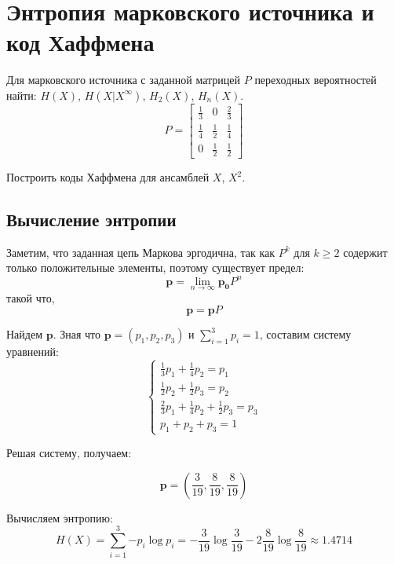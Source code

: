 \section{Энтропия марковского источника и код Хаффмена}
Для марковского источника с заданной матрицей $P$ переходных вероятностей найти: $H(X)$,
$H(X|X^{\infty})$,
$H_2(X)$,
$H_n(X)$.
\renewcommand{\arraystretch}{2.0}
\begin{equation}
P=
\left[\begin{array}{ccc}
\frac13 & 0 & \frac23 \\
\frac14 & \frac 12 & \frac14 \\
0 & \frac12 & \frac12
\end{array}\right]
\end{equation}

Построить коды Хаффмена для ансамблей $X$, $X^2$.

\subsection{Вычисление энтропии}
Заметим, что заданная цепь Маркова эргодична, так как $P^k$ для $k \ge 2$ содержит только положительные элементы, поэтому существует предел:
\begin{equation}
    \mathbf{p} = \lim\limits_{n \to \infty} \mathbf{p_0}P^n
\end{equation}
такой что,
\begin{equation}
    \mathbf{p} = \mathbf{p} P
\end{equation}

Найдем $\mathbf{p}$. Зная что $\mathbf{p} = (p_1, p_2, p_3)$ и $\sum\limits_{i=1}^3{p_i} = 1$, составим систему уравнений:
\begin{equation}
\left\{
\begin{aligned}
\frac13p_1+\frac14p_2=p_1 \\
\frac12p_2+\frac12p_3=p_2 \\
\frac23p_1+\frac14p_2+\frac12p_3=p_3 \\
p_1+p_2+p_3=1
\end{aligned}
\right.
\end{equation}

Решая систему, получаем:

\begin{equation}
    \mathbf{p} = \left(\frac3{19}, \frac8{19}, \frac8{19}\right)
\end{equation}

Вычисляем энтропию:
\begin{equation}
H(X)=\sum\limits_{i=1}^3{-p_i\log{p_i}}=-\frac{3}{19}\log\frac{3}{19}-2\frac{8}{19}\log\frac{8}{19}\approx 1.4714
\end{equation}

